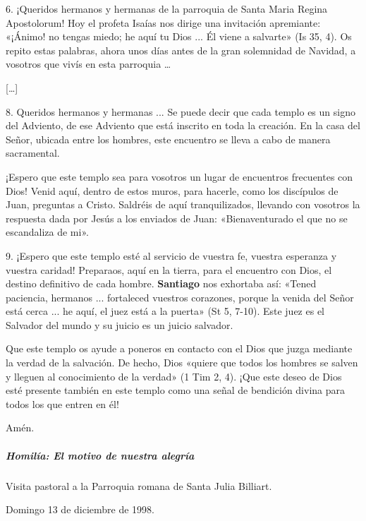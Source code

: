 \documentclass[]{article}
\let\oldsubparagraph\subparagraph
\renewcommand{\subparagraph}[1]{\oldsubparagraph{#1}\mbox{}}
\begin{document}
6. ¡Queridos hermanos y hermanas de la parroquia de Santa Maria Regina
Apostolorum! Hoy el profeta Isaías nos dirige una invitación apremiante:
«¡Ánimo! no tengas miedo; he aquí tu Dios ... Él viene a salvarte» (Is
35, 4). Os repito estas palabras, ahora unos días antes de la gran
solemnidad de Navidad, a vosotros que vivís en esta parroquia \ldots{}

{[}\ldots{}{]}

8. Queridos hermanos y hermanas ... Se puede decir que cada templo es un
signo del Adviento, de ese Adviento que está inscrito en toda la
creación. En la casa del Señor, ubicada entre los hombres, este
encuentro se lleva a cabo de manera sacramental.

¡Espero que este templo sea para vosotros un lugar de encuentros
frecuentes con Dios! Venid aquí, dentro de estos muros, para hacerle,
como los discípulos de Juan, preguntas a Cristo. Saldréis de aquí
tranquilizados, llevando con vosotros la respuesta dada por Jesús a los
enviados de Juan: «Bienaventurado el que no se escandaliza de mi».

9. ¡Espero que este templo esté al servicio de vuestra fe, vuestra
esperanza y vuestra caridad! Preparaos, aquí en la tierra, para el
encuentro con Dios, el destino definitivo de cada hombre.
\textbf{Santiago} nos exhortaba así: «Tened paciencia, hermanos ...
fortaleced vuestros corazones, porque la venida del Señor está cerca ...
he aquí, el juez está a la puerta» (St 5, 7-10). Este juez es el
Salvador del mundo y su juicio es un juicio salvador.

Que este templo os ayude a poneros en contacto con el Dios que juzga
mediante la verdad de la salvación. De hecho, Dios «quiere que todos los
hombres se salven y lleguen al conocimiento de la verdad» (1 Tim 2, 4).
¡Que este deseo de Dios esté presente también en este templo como una
señal de bendición divina para todos los que entren en él!

Amén.

\protect\hypertarget{_Toc448662745}{}{\protect\hypertarget{_Toc448690264}{}{\protect\hypertarget{_Toc448708287}{}{\protect\hypertarget{_Toc448709373}{}{\protect\hypertarget{_Toc449554375}{}{}}}}}

\subparagraph{Homilía: El motivo de nuestra
alegría}\label{homiluxeda-el-motivo-de-nuestra-alegruxeda}

Visita pastoral a la Parroquia romana de Santa Julia Billiart.

Domingo 13 de diciembre de 1998.
\end{document}
